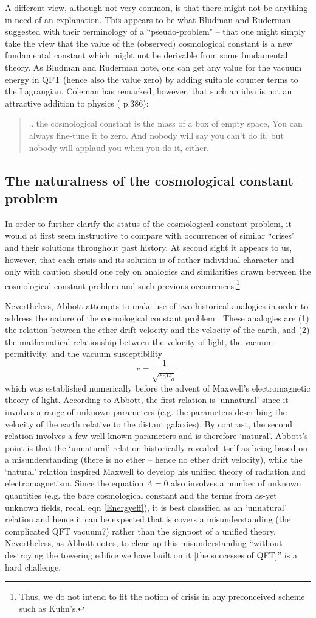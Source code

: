 \documentclass[12pt]{article}
\def\ss{\subsection}
\begin{document}
A different view, although not very common, is that there might
not be anything in need of an explanation. This appears to be what
Bludman and Ruderman suggested with their terminology of a
``pseudo-problem" -- that one might simply take the view that the
value of the (observed) cosmological constant is a new fundamental
constant which might not be derivable from some fundamental
theory. As Bludman and Ruderman note, one can get any value for
the vacuum energy in QFT (hence also the value zero) by adding
suitable counter terms to the Lagrangian. Coleman has remarked,
however, that such an idea is not an attractive addition to
physics (\cite{cao99} p.386):
\begin{quote}
...the cosmological constant is the mass of a box of empty space,
You can always fine-tune it to zero. And nobody will say you can't
do it, but nobody will applaud you when you do it, either.
\end{quote} 


\ss{The naturalness of the cosmological constant problem}

In order to further clarify the status of the cosmological
constant problem, it would at first seem instructive to compare
with occurrences of similar ``crises" and their solutions
throughout past history. At second sight it appears to us,
however, that each crisis and its solution is of rather individual
character and only with caution should one rely on analogies and
similarities drawn between the cosmological constant problem and
such previous occurrences.\footnote{Thus, we do not intend to fit
the notion of crisis in any preconceived scheme such as Kuhn's.} 

Nevertheless, Abbott attempts to make use of two historical
analogies in order to address the nature of the cosmological
constant problem \cite{Abbott88}. These analogies are (1) the
relation between the ether drift velocity and the velocity of the
earth, and (2) the mathematical relationship between the velocity
of light, the vacuum permitivity, and the vacuum susceptibility
$$c=\frac{1}{\sqrt{ \epsilon_0 \mu_o} } \; $$ which was
established numerically before the advent of Maxwell's
electromagnetic theory of light. According to Abbott, the first
relation is `unnatural' since it involves a range of unknown
parameters (e.g. the parameters describing the velocity of the
earth relative to the distant galaxies). By contrast, the second
relation involves a few well-known parameters and is therefore
`natural'. Abbott's point is that the `unnatural' relation
historically revealed itself as being based on a misunderstanding
(there is no ether -- hence no ether drift velocity), while the
`natural' relation inspired Maxwell to develop his unified theory
of radiation and electromagnetism. Since the equation $\Lambda =
0$ also involves a number of unknown quantities (e.g. the bare
cosmological constant and the terms from as-yet unknown fields,
recall eqn \ref{Energyeff}), it is best classified as an
`unnatural' relation and hence it can be expected that is covers a
misunderstanding (the complicated QFT vacuum?) rather than the
signpost of a unified theory. Nevertheless, as Abbott notes, to
clear up this misunderstanding ``without destroying the towering
edifice we have built on it [the successes of QFT]'' is a hard
challenge.
\end{document}
